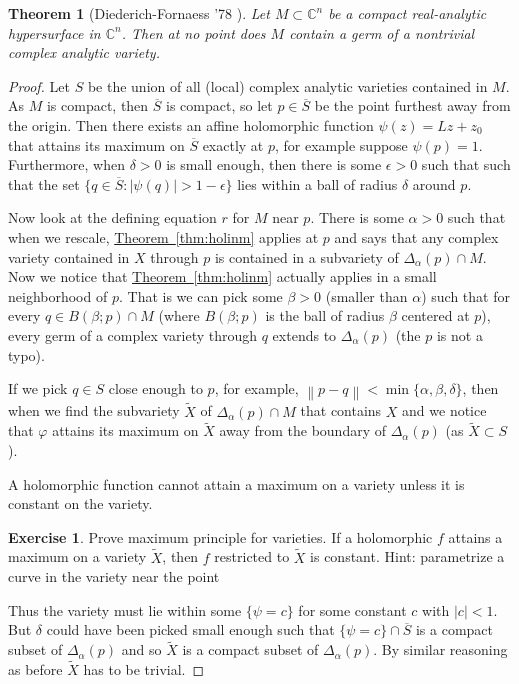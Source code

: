 \documentclass[12pt,openany]{book}
\newcommand{\abs}[1]{\left\lvert {#1} \right\rvert}
\newcommand{\norm}[1]{\left\lVert {#1} \right\rVert}
\newcommand{\C}{{\mathbb{C}}}
\theoremstyle{plain}
\newtheorem{thm}{Theorem}[section]
\theoremstyle{remark}
\theoremstyle{definition}
\theoremstyle{exercise}
\newtheorem{exercise}{Exercise}[section]
\theoremstyle{example}
\newcommand{\thmref}[1]{\hyperref[#1]{Theorem~\ref*{#1}}}
\begin{document}
\begin{thm}[Diederich-Fornaess '78 \cite{DF}] \label{df:thm}
Let $M \subset \C^n$ be a compact real-analytic hypersurface in $\C^n$.
Then at no point does $M$ contain a germ of a nontrivial complex analytic
variety.
\end{thm}

\begin{proof}
Let $S$ be the union of all (local) complex analytic varieties contained in $M$.
As $M$ is compact, then $\overline{S}$ is compact, so let $p \in
\overline{S}$ be the point furthest away from the origin.  Then there exists
an affine holomorphic function $\psi(z)=Lz+z_0$ that attains its 
maximum on $\overline{S}$ exactly at $p$, for example suppose $\psi(p) = 1$.
Furthermore, when $\delta > 0$ is small enough,
then there is some $\epsilon > 0$ such that
such that the set
$\{ q \in \overline{S} : \abs{\psi(q)} > 1-\epsilon \}$ lies
within a ball of radius $\delta$ around $p$.

Now look at the defining equation $r$ for $M$ near $p$.  There is some
$\alpha > 0$ such that when we rescale,
\thmref{thm:holinm} applies at $p$ and says that any complex variety
contained in $X$ through $p$ is contained in a subvariety of
$\Delta_{\alpha}(p) \cap M$.  Now we notice that
\thmref{thm:holinm} actually applies in a small neighborhood of $p$.
That is we can pick some $\beta > 0$ (smaller than $\alpha$) such that
for every
$q \in B(\beta;p) \cap M$
(where $B(\beta;p)$ is the
ball of radius $\beta$ centered at $p$),
every germ of a complex variety through $q$ extends to
$\Delta_{\alpha}(p)$ (the $p$ is not a typo).

If we pick $q \in S$ close enough to $p$, for example,
$\norm{p-q} < \min\{ \alpha , \beta, \delta \}$, then when we find the
subvariety $\tilde{X}$ of $\Delta_\alpha(p) \cap M$ that contains $X$
and
we notice that $\varphi$ attains its maximum on $\tilde{X}$ away from the boundary
of $\Delta_\alpha(p)$ (as $\tilde{X} \subset S$).

A holomorphic function cannot attain a maximum on a variety
unless it is constant on the variety.

\begin{exercise}
Prove maximum principle for varieties.  If a holomorphic $f$ attains
a maximum on a variety $\tilde{X}$, then $f$ restricted to $\tilde{X}$ is constant.
Hint: parametrize a curve
in the variety near the point
\end{exercise}

Thus the variety must lie within some
$\{ \psi = c \}$ for some constant $c$ with $\abs{c} < 1$.
But $\delta$ could have been picked small enough
such that $\{ \psi = c \} \cap \overline{S}$ is a compact subset
of $\Delta_\alpha(p)$ and so $\tilde{X}$ is a compact subset of $\Delta_\alpha(p)$.
By similar reasoning as before $\tilde{X}$ has to be trivial.
\end{proof}
\end{document}
